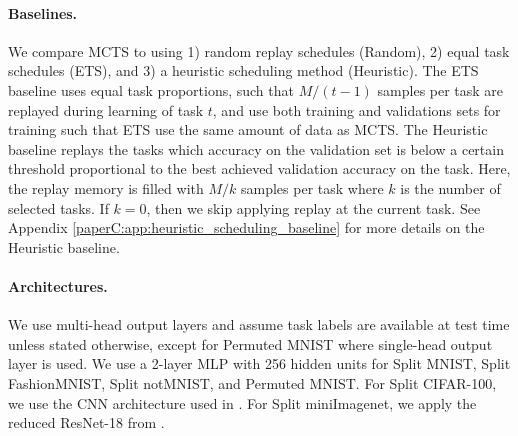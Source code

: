 \vspace{-3mm}
\paragraph{Baselines.} We compare MCTS to using 1) random replay schedules (Random), 2) equal task schedules (ETS), and 3) a heuristic scheduling method (Heuristic). The ETS baseline uses equal task proportions, such that $M/(t-1)$ samples per task are replayed during learning of task $t$, and use both training and validations sets for training such that ETS use the same amount of data as MCTS. %
The Heuristic baseline replays the tasks which accuracy on the validation set is below a certain threshold proportional to the best achieved validation accuracy on the task. Here, the replay memory is filled with $M/k$ samples per task where $k$ is the number of selected tasks. If $k=0$, then we skip applying replay at the current task.  
See Appendix \ref{paperC:app:heuristic_scheduling_baseline} for more details on the Heuristic baseline. 



%

\vspace{-3mm}
\paragraph{Architectures.}  
We use multi-head output layers and assume task labels are available at test time unless stated otherwise, except for Permuted MNIST where single-head output layer is used. We use a 2-layer MLP with 256 hidden units for Split MNIST, Split FashionMNIST, Split notMNIST, and Permuted MNIST. For Split CIFAR-100, we use the CNN architecture used in . For Split miniImagenet, we apply the reduced ResNet-18 from . 

\vspace{-3mm}
